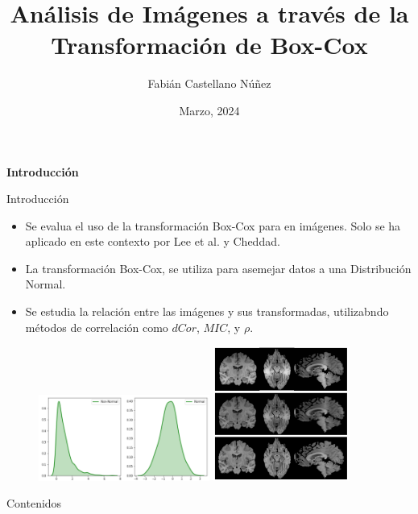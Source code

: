 \documentclass{beamer}
\title[Defensa de Memoria]{\bf An\'alisis de Im\'agenes a trav\'es de la Transformaci\'on de Box-Cox}
\author{Fabián Castellano Núñez}
\institute[Universidad Técnica Federico Santa María]
  {
  Profesor Guia: Ronny Vallejos A.
  }
\date{Marzo,  2024}
\begin{document}
\begin{frame}
  \titlepage
\end{frame}
\begin{frame}
    \begin{center}
        {\LARGE\bf Introducción}
    \end{center}
\end{frame}

\begin{frame}{Introducción}
    \begin{itemize}
        \item Se evalua el uso de la transformación Box-Cox para en im\'agenes. Solo se ha aplicado en este contexto por Lee et al. y Cheddad.
        \item La transformación Box-Cox, se utiliza para asemejar datos a una Distribución Normal.
        \item Se estudia la relación entre las im\'agenes y sus transformadas, utilizabndo métodos de correlación como $dCor$, $MIC$, y $\rho$.
    \end{itemize}

    \begin{figure}
        \includegraphics[width=0.5\textwidth]{output275.png}
        \hfill
        \includegraphics[width=0.4\textwidth]{brains.png}
    \end{figure}
\end{frame}


\begin{frame}{Contenidos}
  \tableofcontents
\end{frame}
\end{document}
